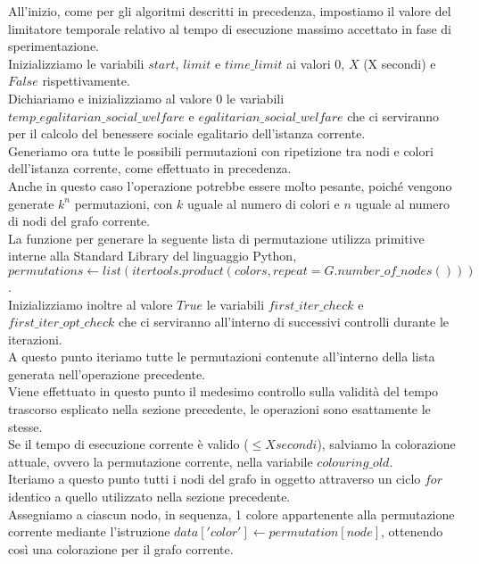 \newpage

All'inizio, come per gli algoritmi descritti in precedenza, impostiamo il valore del limitatore temporale relativo al tempo di esecuzione massimo accettato in fase di sperimentazione.\\
Inizializziamo le variabili $start$, $limit$ e $time\_limit$ ai valori $0$, $X$ (X secondi) e $False$ rispettivamente.\\

Dichiariamo e inizializziamo al valore $0$ le variabili \\
$temp\_egalitarian\_social\_welfare$ e $egalitarian\_social\_welfare$ che ci serviranno per il calcolo del benessere sociale egalitario dell'istanza corrente.\\

Generiamo ora tutte le possibili permutazioni con ripetizione tra nodi e colori dell'istanza corrente, come effettuato in precedenza.\\
Anche in questo caso l'operazione potrebbe essere molto pesante, poiché vengono generate \(k^n\) permutazioni, con $k$ uguale al numero di colori e $n$ uguale al numero di nodi del grafo corrente.\\
La funzione per generare la seguente lista di permutazione utilizza primitive interne alla Standard Library del linguaggio Python, $permutations\gets list(itertools.product(colors, repeat=G.number\_of\_nodes()))$.\\

Inizializziamo inoltre al valore $True$ le variabili $first\_iter\_check$ e \\
$first\_iter\_opt\_check$ che ci serviranno all'interno di successivi controlli durante le iterazioni.\\

A questo punto iteriamo tutte le permutazioni contenute all'interno della lista generata nell'operazione precedente.\\
Viene effettuato in questo punto il medesimo controllo sulla validità del tempo trascorso esplicato nella sezione precedente, le operazioni sono esattamente le stesse.\\
Se il tempo di esecuzione corrente è valido (\(\leq X secondi\)), salviamo la colorazione attuale, ovvero la permutazione corrente, nella variabile $colouring\_old$.\\

Iteriamo a questo punto tutti i nodi del grafo in oggetto attraverso un ciclo $for$ identico a quello utilizzato nella sezione precedente.\\
Assegniamo a ciascun nodo, in sequenza, 1 colore appartenente alla permutazione corrente mediante l'istruzione $data['color']\gets permutation[node]$, ottenendo così una colorazione per il grafo corrente.\\

